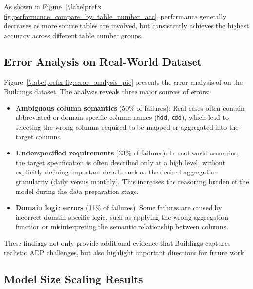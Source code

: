As shown in Figure~\ref{\labelprefix fig:performance_compare_by_table_number_acc}, performance generally decreases as more source tables are involved, but \sys consistently achieves the highest accuracy across different table number groups.

\subsection{Error Analysis on Real-World Dataset}
\label{subsec:appendix_error_analysis}



Figure~\ref{\labelprefix fig:error_analysis_pie} presents the error analysis of \sys on the Buildings dataset. The analysis reveals three major sources of errors:

\begin{itemize}[leftmargin=*]
    \item \textbf{Ambiguous column semantics} (50\% of failures): Real cases often contain abbreviated or domain-specific column names (\eg \texttt{hdd}, \texttt{cdd}), which lead to selecting the wrong columns required to be mapped or aggregated into the target columns.
    \item \textbf{Underspecified requirements} (33\% of failures): In real-world scenarios, the target specification is often described only at a high level, without explicitly defining important details such as the desired aggregation granularity (\eg daily versus monthly). This increases the reasoning burden of the model during the data preparation stage.
    \item \textbf{Domain logic errors} (11\% of failures): Some failures are caused by incorrect domain-specific logic, such as applying the wrong aggregation function or misinterpreting the semantic relationship between columns.
\end{itemize}

These findings not only provide additional evidence that Buildings captures realistic ADP challenges, but also highlight important directions for future work.

\subsection{Model Size Scaling Results}
\label{subsec:appendix_model_scaling}



